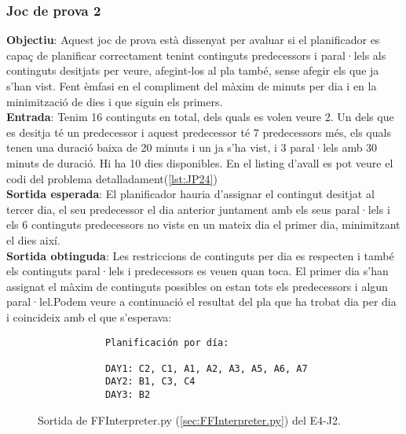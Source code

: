 \documentclass[a4paper]{article}
\begin{document}
	\subsubsection*{Joc de prova 2}
	\noindent \textbf{Objectiu}: Aquest joc de prova està dissenyat per avaluar si el planificador es capaç de planificar correctament tenint continguts predecessors i paral·lels als continguts desitjats per veure, afegint-los al pla també, sense afegir els que ja s'han vist. Fent èmfasi en el compliment del màxim de minuts per dia i en la minimització de dies i que siguin els primers. \\
	
	\noindent \textbf{Entrada}: Tenim 16 continguts en total, dels quals es volen veure 2. Un dels que es desitja té un predecessor i aquest predecessor té 7 predecessors més, els quals tenen una duració baixa de 20 minuts i un ja s'ha vist, i 3 paral·lels amb 30 minuts de duració. Hi ha 10 dies disponibles. En el listing d'avall es pot veure el codi del problema detalladament(\ref{lst:JP24})\\
	
	\noindent \textbf{Sortida esperada}: El planificador hauria d'assignar el contingut desitjat al tercer dia, el seu predecessor el dia anterior juntament amb els seus paral·lels i els 6 continguts predecessors no vists en un mateix dia el primer dia, minimitzant el dies així.\\
	
	\noindent \textbf{Sortida obtinguda}: Les restriccions de continguts per dia es respecten i també els continguts paral·lels i predecessors es veuen quan toca. El primer dia s'han assignat el màxim de continguts possibles on estan tots els predecessors i algun paral·lel.Podem veure a continuació el resultat del pla que ha trobat dia per dia i coincideix amb el que s'esperava:
	
	\begin{figure}[H]
		\centering
		\begin{verbatim}
			Planificación por día:
			
			DAY1: C2, C1, A1, A2, A3, A5, A6, A7
			DAY2: B1, C3, C4
			DAY3: B2
		\end{verbatim}
		\caption{Sortida de FFInterpreter.py (\ref{sec:FFInterpreter.py}) del E4-J2.}
	\end{figure}
	
	
	
\end{document}
